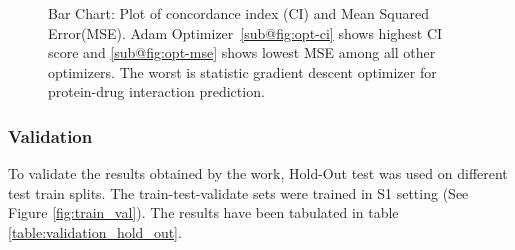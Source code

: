 \begin{figure}[htbp]
    \quad
    \caption[Optimizer Chart: CI and MSE]{Bar Chart: Plot of concordance index (CI) and Mean Squared Error(MSE). Adam Optimizer~\ref{sub@fig:opt-ci} shows highest CI score and \ref{sub@fig:opt-mse} shows lowest MSE among all other optimizers. The worst is statistic gradient descent optimizer for protein-drug interaction prediction.}
    \label{fig:optimizer_plot}
\end{figure}

\subsubsection{Validation}
To validate the results obtained by the work, Hold-Out test was used on different test train splits. The train-test-validate sets were trained in S1 setting (See Figure \ref{fig:train_val}). The results have been tabulated in table \ref{table:validation_hold_out}.

